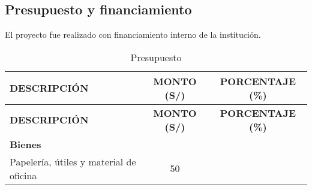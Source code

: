 \documentclass[]{article}
\begin{document}
\subsection{Presupuesto y
financiamiento}\label{presupuesto-y-financiamiento}

El proyecto fue realizado con financiamiento interno de la institución.

\begin{longtable}[]{@{}lcc@{}}
\caption{Presupuesto}\tabularnewline
\toprule
\begin{minipage}[b]{0.46\columnwidth}\raggedright\strut
\textbf{DESCRIPCIÓN}\strut
\end{minipage} & \begin{minipage}[b]{0.22\columnwidth}\centering\strut
\textbf{MONTO (S/)}\strut
\end{minipage} & \begin{minipage}[b]{0.22\columnwidth}\centering\strut
\textbf{PORCENTAJE (\%)}\strut
\end{minipage}\tabularnewline
\midrule
\endfirsthead
\toprule
\begin{minipage}[b]{0.46\columnwidth}\raggedright\strut
\textbf{DESCRIPCIÓN}\strut
\end{minipage} & \begin{minipage}[b]{0.22\columnwidth}\centering\strut
\textbf{MONTO (S/)}\strut
\end{minipage} & \begin{minipage}[b]{0.22\columnwidth}\centering\strut
\textbf{PORCENTAJE (\%)}\strut
\end{minipage}\tabularnewline
\midrule
\endhead
\begin{minipage}[t]{0.46\columnwidth}\raggedright\strut
\textbf{Bienes}\strut
\end{minipage} & \begin{minipage}[t]{0.22\columnwidth}\centering\strut
\strut
\end{minipage} & \begin{minipage}[t]{0.22\columnwidth}\centering\strut
\strut
\end{minipage}\tabularnewline
\begin{minipage}[t]{0.46\columnwidth}\raggedright\strut
Papelería, útiles y material de oficina\strut
\end{minipage} & \begin{minipage}[t]{0.22\columnwidth}\centering\strut
50\strut
\end{minipage} & \begin{minipage}[t]{0.22\columnwidth}\centering\strut

\end{minipage}
\end{longtable}
\end{document}
